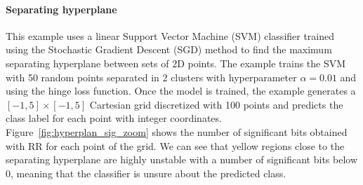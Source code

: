 \documentclass[11pt]{article}
\newcommand{\tristan}[1]{\color{orange}\textbf{From Tristan:} #1\color{black}\xspace}
\newcommand{\Yohan}[1]{\color{green!75!black}\textbf{Yohan:} #1\color{black}\xspace}
\begin{document}



\paragraph{Separating hyperplane}

This example uses a linear Support Vector Machine (SVM) classifier trained using the Stochastic Gradient Descent (SGD) method to find the maximum separating hyperplane between sets of 2D points.
The example trains the SVM with 50 random points separated in 2 clusters with hyperparameter $\alpha=0.01$ and using the hinge loss function. Once the model is trained, the example generates a $[-1,5]\times[-1,5]$ Cartesian grid
discretized with 100 points and predicts the class label for each point with integer coordinates. Figure~\ref{fig:hyperplan_sig_zoom} shows the number of significant bits %
obtained with RR for each point of the grid. %
We can see that yellow regions %
close to the separating hyperplane are highly unstable with a number of significant bits below 0, meaning that
the classifier is unsure about the predicted class. 


\end{document}

